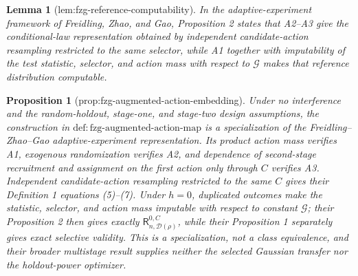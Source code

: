 \documentclass{article}
\newtheorem{lemma}{Lemma}
\newtheorem{proposition}{Proposition}
\begin{document}
\begin{lemma}[lem:fzg-reference-computability]\label{lem:fzg-reference-computability}
In the adaptive-experiment framework of Freidling, Zhao, and Gao, Proposition 2 states that A2--A3 give the conditional-law representation obtained by independent candidate-action resampling restricted to the same selector, while A1 together with imputability of the test statistic, selector, and action mass with respect to \(\mathcal G\) makes that reference distribution computable.
\end{lemma}

\begin{proposition}[prop:fzg-augmented-action-embedding]\label{prop:fzg-augmented-action-embedding}
Under no interference and the random-holdout, stage-one, and stage-two design assumptions, the construction in \(\mathrm{def{:}fzg\mbox{-}augmented\mbox{-}action\mbox{-}map}\) is a specialization of the Freidling--Zhao--Gao adaptive-experiment representation.  Its product action mass verifies A1, exogenous randomization verifies A2, and dependence of second-stage recruitment and assignment on the first action only through \(C\) verifies A3.  Independent candidate-action resampling restricted to the same \(C\) gives their Definition 1 equations (5)--(7).  Under \(h=0\), duplicated outcomes make the statistic, selector, and action mass imputable with respect to constant \(\mathcal G\); their Proposition 2 then gives exactly \(\mathsf R_{n,\mathcal D(\rho)}^{0,C}\), while their Proposition 1 separately gives exact selective validity.  This is a specialization, not a class equivalence, and their broader multistage result supplies neither the selected Gaussian transfer nor the holdout-power optimizer.
\end{proposition}
\end{document}
